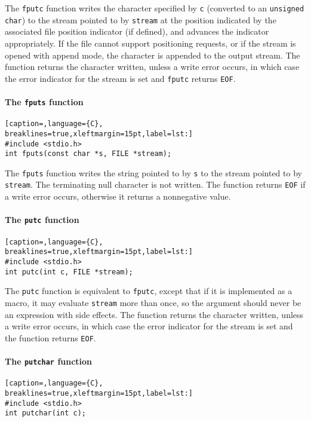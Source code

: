 The \texttt{fputc} function writes the character specified by \texttt{c}
(converted to an \texttt{unsigned char}) to the stream pointed to by
\texttt{stream} at the position indicated by the associated file position
indicator (if defined), and advances the indicator appropriately. If the file
cannot support positioning requests, or if the stream is opened with append
mode, the character is appended to the output stream. The function returns the
character written, unless a write error occurs, in which case the error
indicator for the stream is set and \texttt{fputc} returns \texttt{EOF}.

\paragraph{The \texttt{fputs} function}
\lstset{basicstyle=\scriptsize, numbers=left, captionpos=b, tabsize=4}
\begin{lstlisting}[caption=,language={C},
breaklines=true,xleftmargin=15pt,label=lst:]
#include <stdio.h>
int fputs(const char *s, FILE *stream);
\end{lstlisting}

The \texttt{fputs} function writes the string pointed to by \texttt{s} to the
stream pointed to by \texttt{stream}. The terminating null character is not
written. The function returns \texttt{EOF} if a write error occurs, otherwise
it returns a nonnegative value.

\paragraph{The \texttt{putc} function}
\lstset{basicstyle=\scriptsize, numbers=left, captionpos=b, tabsize=4}
\begin{lstlisting}[caption=,language={C},
breaklines=true,xleftmargin=15pt,label=lst:]
#include <stdio.h>
int putc(int c, FILE *stream);
\end{lstlisting}

The \texttt{putc} function is equivalent to \texttt{fputc}, except that if it
is implemented as a macro, it may evaluate \texttt{stream} more than once, so
the argument should never be an expression with side effects. The function
returns the character written, unless a write error occurs, in which case the
error indicator for the stream is set and the function returns \texttt{EOF}.

\paragraph{The \texttt{putchar} function}
\lstset{basicstyle=\scriptsize, numbers=left, captionpos=b, tabsize=4}
\begin{lstlisting}[caption=,language={C},
breaklines=true,xleftmargin=15pt,label=lst:]
#include <stdio.h>
int putchar(int c);
\end{lstlisting}

